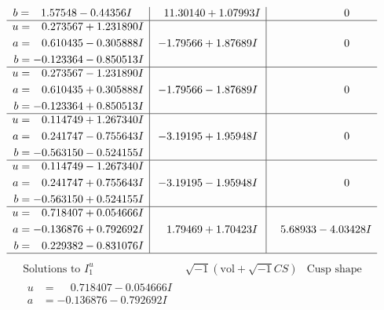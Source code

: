 \documentclass[1p]{elsarticle_modified}
\theoremstyle{definition}
\newcommand{\I}{\sqrt{-1}}
\begin{document}
$$\begin{array}{c|c|c}
\begin{aligned}
b &= \phantom{-}1.57548 - 0.44356 I\end{aligned}
 & \phantom{-}11.30140 + 1.07993 I & \phantom{-0.000000 } 0 \\ \hline\begin{aligned}
u &= \phantom{-}0.273567 + 1.231890 I \\
a &= \phantom{-}0.610435 - 0.305888 I \\
b &= -0.123364 - 0.850513 I\end{aligned}
 & -1.79566 + 1.87689 I & \phantom{-0.000000 } 0 \\ \hline\begin{aligned}
u &= \phantom{-}0.273567 - 1.231890 I \\
a &= \phantom{-}0.610435 + 0.305888 I \\
b &= -0.123364 + 0.850513 I\end{aligned}
 & -1.79566 - 1.87689 I & \phantom{-0.000000 } 0 \\ \hline\begin{aligned}
u &= \phantom{-}0.114749 + 1.267340 I \\
a &= \phantom{-}0.241747 - 0.755643 I \\
b &= -0.563150 - 0.524155 I\end{aligned}
 & -3.19195 + 1.95948 I & \phantom{-0.000000 } 0 \\ \hline\begin{aligned}
u &= \phantom{-}0.114749 - 1.267340 I \\
a &= \phantom{-}0.241747 + 0.755643 I \\
b &= -0.563150 + 0.524155 I\end{aligned}
 & -3.19195 - 1.95948 I & \phantom{-0.000000 } 0 \\ \hline\begin{aligned}
u &= \phantom{-}0.718407 + 0.054666 I \\
a &= -0.136876 + 0.792692 I \\
b &= \phantom{-}0.229382 - 0.831076 I\end{aligned}
 & \phantom{-}1.79469 + 1.70423 I & \phantom{-}5.68933 - 4.03428 I\\
 \hline 
 \end{array}$$\newpage$$\begin{array}{c|c|c}  
\text{Solutions to }I^u_{1}& \I (\text{vol} + \sqrt{-1}CS) & \text{Cusp shape}\\
 \hline 
\begin{aligned}
u &= \phantom{-}0.718407 - 0.054666 I \\
a &= -0.136876 - 0.792692 I \\

\end{aligned}
\end{array}$$
\end{document}
